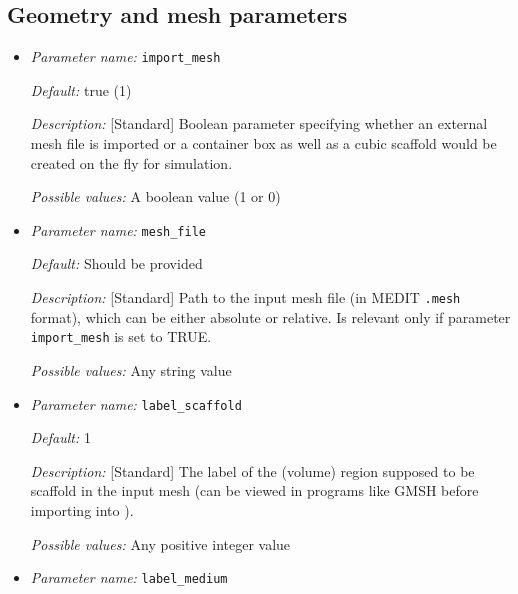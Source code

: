 \subsection{Geometry and mesh parameters}
\label{parameters:mesh}

\begin{itemize}

\item {\it Parameter name:} {\tt import\_mesh}
\label{parameters:import_mesh}


{\it Default:} true (1)

{\it Description:} [Standard] Boolean parameter specifying whether an external mesh file is imported or a container box as well as a cubic scaffold would be created on the fly for simulation.

{\it Possible values:} A boolean value (1 or 0)

\item {\it Parameter name:} {\tt mesh\_file}
\label{parameters:mesh_file}


{\it Default:} Should be provided

{\it Description:} [Standard] Path to the input mesh file (in MEDIT {\tt .mesh} format), which can be either absolute or relative. Is relevant only if parameter {\tt import\_mesh} is set to TRUE.

{\it Possible values:} Any string value 


\item {\it Parameter name:} {\tt label\_scaffold}
\label{parameters:label_scaffold}


{\it Default:} 1

{\it Description:} [Standard] The label of the (volume) region supposed to be scaffold in the input mesh (can be viewed in programs like GMSH before importing into \biodeg{}). 

{\it Possible values:} Any positive integer value 


\item {\it Parameter name:} {\tt label\_medium}
\label{parameters:label_medium}



\end{itemize}
